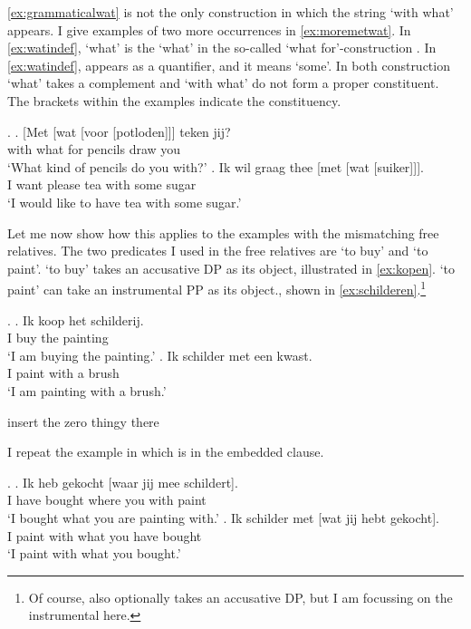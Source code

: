 \documentclass{article}
\begin{document}
\ref{ex:grammaticalwat} is not the only construction in which the string  `with what' appears. I give examples of two more occurrences in \ref{ex:moremetwat}. In \ref{ex:watindef},  `what' is the  `what' in the so-called  `what for'-construction \citep[cf.][]{corver1991}.
In \ref{ex:watindef},  appears as a quantifier, and it means `some'. In both construction  `what' takes a complement and  `with what' do not form a proper constituent. The brackets within the examples indicate the constituency.

\ex.\label{ex:moremetwat}
\ag. [Met [wat [voor [potloden]]] teken jij?\\
 with what for pencils draw you\\
 `What kind of pencils do you with?'\label{ex:watwasfur}
\bg. Ik wil graag thee [met [wat [suiker]]].\\
 I want please tea with some sugar\\
 `I would like to have tea with some sugar.'\label{ex:watindef}

Let me now show how this applies to the examples with the mismatching free relatives. The two predicates I used in the free relatives are  `to buy' and   `to paint'.  `to buy' takes an accusative DP as its object, illustrated in \ref{ex:kopen}.  `to paint' can take an instrumental PP as its object., shown in \ref{ex:schilderen}.\footnote{Of course,  also optionally takes an accusative DP, but I am focussing on the instrumental here.}

\ex.
\ag. Ik koop het schilderij.\\
 I buy the painting\\
 `I am buying the painting.'\label{ex:kopen}
\bg. Ik schilder met een kwast.\\
 I paint with a brush\\
 `I am painting with a brush.'\label{ex:schilderen}

insert the zero thingy there



I repeat the example in which  is in the embedded clause.

\ex.
\ag. Ik heb gekocht [waar jij mee schildert].\\
 I have bought where you with paint\\
 `I bought what you are painting with.'
\bg. Ik schilder met [wat jij hebt gekocht].\\
 I paint with what you have bought\\
 `I paint with what you bought.'
\end{document}
